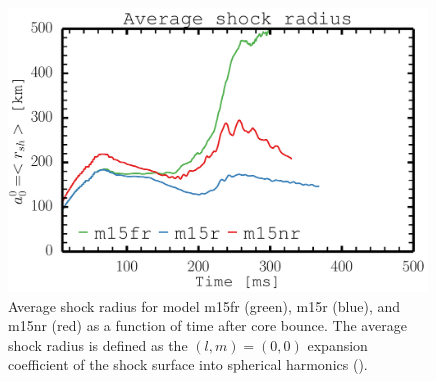 \begin{figure}[ht]         
\centering                            
\includegraphics[width=0.99\textwidth]{./images/paper2/rsh.pdf}
\caption{Average shock radius for model m15fr (green), m15r (blue), and m15nr (red) as a function of 
time after core bounce. The average shock radius is defined as the $(l,m) = (0,0)$ expansion coefficient of the shock surface into 
spherical harmonics (). \label{figp2:rsh}}
\end{figure}
